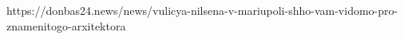  
 
 
 
 


https://donbas24.news/news/vulicya-nilsena-v-mariupoli-shho-vam-vidomo-pro-znamenitogo-arxitektora
